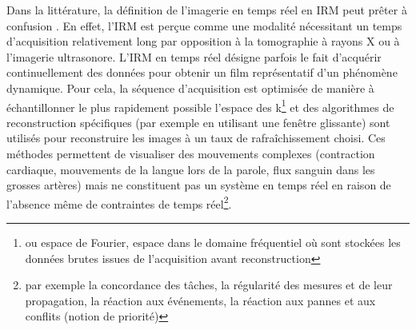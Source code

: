 Dans la littérature, la définition de l’imagerie en temps réel en \ac{IRM} peut prêter à confusion \cite{dietz2018nomenclature}. En effet, l’\ac{IRM} est perçue comme une modalité nécessitant un temps d’acquisition relativement long par opposition à la tomographie à rayons X ou à l’imagerie ultrasonore. L’\ac{IRM} en temps réel désigne parfois le fait d’acquérir continuellement des données pour obtenir un film représentatif d’un phénomène dynamique. Pour cela, la séquence d’acquisition est optimisée de manière à échantillonner le plus rapidement possible l’espace des k\footnote{ou espace de Fourier, espace dans le domaine fréquentiel où sont stockées les données brutes issues de l’acquisition avant reconstruction} et des algorithmes de reconstruction spécifiques (par exemple en utilisant une fenêtre glissante) sont utilisés pour reconstruire les images à un taux de rafraîchissement choisi. Ces méthodes permettent de visualiser des mouvements complexes (contraction cardiaque, mouvements de la langue lors de la parole, flux sanguin dans les grosses artères) mais ne constituent pas un système en temps réel en raison de l’absence même de contraintes de temps réel\footnote{par exemple la concordance des tâches, la régularité des mesures et de leur propagation, la réaction aux événements, la réaction aux pannes et aux conflits (notion de priorité)}.\\